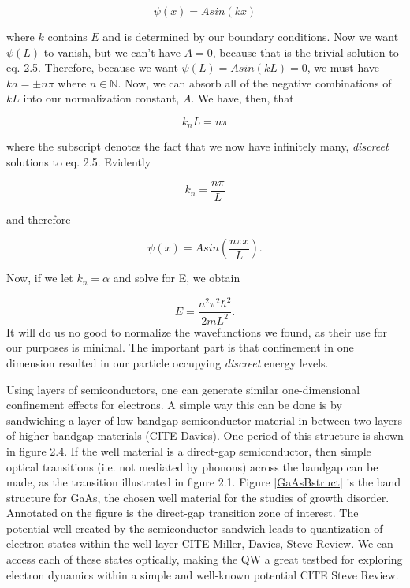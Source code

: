 \begin{equation} \label{soln1}
\psi(x) = A sin(k x) 
\end{equation}

where $k$ contains $E$ and is determined by our boundary conditions. Now we want $\psi(L)$ to vanish, but we can't have $A =0$, because that is the trivial solution to eq. 2.5. Therefore, because we want $\psi(L) = Asin(k L) = 0 $, we must have $ka = \pm n \pi$ where $n \in \mathbb{N}$. Now, we can absorb all of the negative combinations of $k L$ into our normalization constant, $A$. We have, then, that 

\begin{equation}
k_n L = n \pi 
\end{equation}

where the subscript denotes the fact that we now have infinitely many, \textit{discreet} solutions to eq. 2.5. Evidently 

\begin{equation}
k_n = \frac{ n \pi}{L}
\end{equation}

and therefore

\begin{equation}
\psi(x) = A sin(\frac{n \pi x}{L}).
\end{equation}

Now, if we let $k_n = \alpha$ and solve for E, we obtain

\begin{equation}
E = \frac{n^2 \pi^2 \hbar^2}{2 m L^2}.
\end{equation}
It will do us no good to normalize the wavefunctions we found, as their use for our purposes is minimal. The important part is that confinement in one dimension resulted in our particle occupying \textit{discreet} energy levels. 

\indent Using layers of semiconductors, one can generate similar one-dimensional confinement effects for electrons. A simple way this can be done is by sandwiching a layer of low-bandgap semiconductor material in between two layers of higher bandgap materials (CITE Davies). One period of this structure is shown in figure 2.4. If the well material is a direct-gap semiconductor, then simple optical transitions (i.e. not mediated by phonons) across the bandgap can be made, as the transition illustrated in figure 2.1. Figure \ref{GaAsBstruct} is the band structure for GaAs, the chosen well material for the studies of growth disorder. Annotated on the figure is the direct-gap transition zone of interest. The potential well created by the semiconductor sandwich leads to quantization of electron states within the well layer CITE Miller, Davies, Steve Review. We can access each of these states optically, making the QW a great testbed for exploring electron dynamics within a simple and well-known potential CITE Steve Review. 

